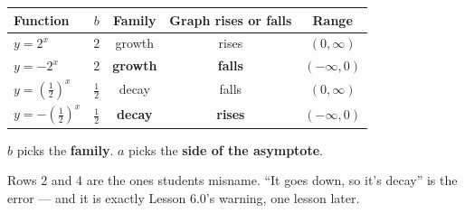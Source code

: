 \documentclass[aspectratio=169, 11pt]{beamer}
\begin{document}
\begin{frame}[t, plain]
  \begin{center}
  \footnotesize
  \renewcommand{\arraystretch}{1.4}
  \begin{tabular}{|l|c|c|c|c|}
  \hline
  \textbf{Function} & \textbf{$b$} & \textbf{Family} & \textbf{Graph rises or falls} & \textbf{Range} \\
  \hline
  $y=2^{x}$ & $2$ & growth & rises & $(0,\infty)$ \\
  $y=-2^{x}$ & $2$ & \textbf{growth} & \textbf{falls} & $(-\infty,0)$ \\
  $y=\left(\frac12\right)^{x}$ & $\frac12$ & decay & falls & $(0,\infty)$ \\
  $y=-\left(\frac12\right)^{x}$ & $\frac12$ & \textbf{decay} & \textbf{rises} & $(-\infty,0)$ \\
  \hline
  \end{tabular}
  \end{center}
  \vspace{8pt}
  \begin{center}
    \Large $b$ picks the \textbf{family}. \quad $a$ picks the \textbf{side of the asymptote}.
  \end{center}
  \vspace{6pt}
  \begin{center}
    {\footnotesize Rows 2 and 4 are the ones students misname. ``It goes down, so it's decay'' is the
    error --- and it is exactly Lesson 6.0's warning, one lesson later.}
  \end{center}
\end{frame}
\end{document}
